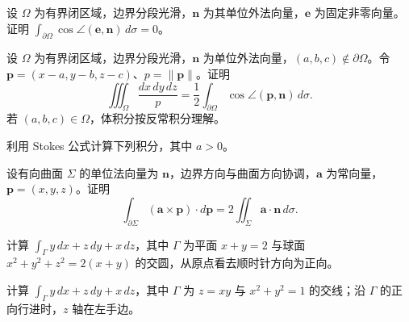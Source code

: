 \noindent\begin{minipage}{\textwidth}
设 $\Omega$ 为有界闭区域，边界分段光滑，$\mathbf n$ 为其单位外法向量，$\mathbf e$ 为固定非零向量。证明 $\int_{\partial\Omega}\cos\angle(\mathbf e,\mathbf n)\,d\sigma=0$。
\end{minipage}\par\vfill
\noindent\begin{minipage}{\textwidth}
设 $\Omega$ 为有界闭区域，边界分段光滑，$\mathbf n$ 为单位外法向量，$(a,b,c)\notin\partial\Omega$。令 $\mathbf p=(x-a,y-b,z-c)$、$p=\|\mathbf p\|$。证明\[\iiint_\Omega\frac{dx\,dy\,dz}{p}=\frac12\int_{\partial\Omega}\cos\angle(\mathbf p,\mathbf n)\,d\sigma.\]若 $(a,b,c)\in\Omega$，体积分按反常积分理解。
\end{minipage}\par\vfill
\newpage
\noindent\begin{minipage}{\textwidth}
利用 Stokes 公式计算下列积分，其中 $a>0$。
\end{minipage}\par\vfill
\noindent\begin{minipage}{\textwidth}
设有向曲面 $\Sigma$ 的单位法向量为 $\mathbf n$，边界方向与曲面方向协调，$\mathbf a$ 为常向量，$\mathbf p=(x,y,z)$。证明\[\int_{\partial\Sigma}(\mathbf a\times\mathbf p)\cdot d\mathbf p=2\iint_\Sigma\mathbf a\cdot\mathbf n\,d\sigma.\]
\end{minipage}\par\vfill
\noindent\begin{minipage}{\textwidth}
计算 $\int_\Gamma y\,dx+z\,dy+x\,dz$，其中 $\Gamma$ 为平面 $x+y=2$ 与球面 $x^2+y^2+z^2=2(x+y)$ 的交圆，从原点看去顺时针方向为正向。
\end{minipage}\par\vfill
\newpage
\noindent\begin{minipage}{\textwidth}
计算 $\int_\Gamma y\,dx+z\,dy+x\,dz$，其中 $\Gamma$ 为 $z=xy$ 与 $x^2+y^2=1$ 的交线；沿 $\Gamma$ 的正向行进时，$z$ 轴在左手边。
\end{minipage}\par\vfill
